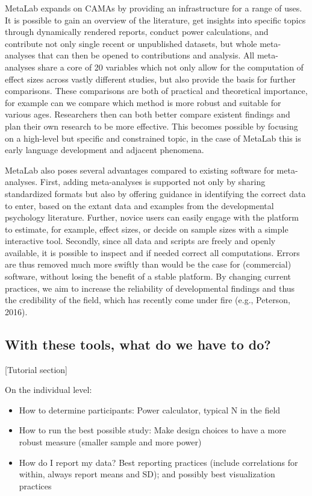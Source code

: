 \documentclass[english,floatsintext,man]{apa6}
\providecommand{\tightlist}{%
  \setlength{\itemsep}{0pt}\setlength{\parskip}{0pt}}
\begin{document}
MetaLab expands on CAMAs by providing an infrastructure for a range of
uses. It is possible to gain an overview of the literature, get insights
into specific topics through dynamically rendered reports, conduct power
calculations, and contribute not only single recent or unpublished
datasets, but whole meta-analyses that can then be opened to
contributions and analysis. All meta-analyses share a core of 20
variables which not only allow for the computation of effect sizes
across vastly different studies, but also provide the basis for further
comparisons. These comparisons are both of practical and theoretical
importance, for example can we compare which method is more robust and
suitable for various ages. Researchers then can both better compare
existent findings and plan their own research to be more effective. This
becomes possible by focusing on a high-level but specific and
constrained topic, in the case of MetaLab this is early language
development and adjacent phenomena.

MetaLab also poses several advantages compared to existing software for
meta-analyses. First, adding meta-analyses is supported not only by
sharing standardized formats but also by offering guidance in
identifying the correct data to enter, based on the extant data and
examples from the developmental psychology literature. Further, novice
users can easily engage with the platform to estimate, for example,
effect sizes, or decide on sample sizes with a simple interactive tool.
Secondly, since all data and scripts are freely and openly available, it
is possible to inspect and if needed correct all computations. Errors
are thus removed much more swiftly than would be the case for
(commercial) software, without losing the benefit of a stable platform.
By changing current practices, we aim to increase the reliability of
developmental findings and thus the credibility of the field, which has
recently come under fire (e.g., Peterson, 2016).

\subsection{With these tools, what do we have to
do?}\label{with-these-tools-what-do-we-have-to-do}

{[}Tutorial section{]}

On the individual level:

\begin{itemize}
\tightlist
\item
  How to determine participants: Power calculator, typical N in the
  field
\item
  How to run the best possible study: Make design choices to have a more
  robust measure (smaller sample and more power)
\item
  How do I report my data? Best reporting practices (include
  correlations for within, always report means and SD); and possibly
  best visualization practices
\end{itemize}
\end{document}
